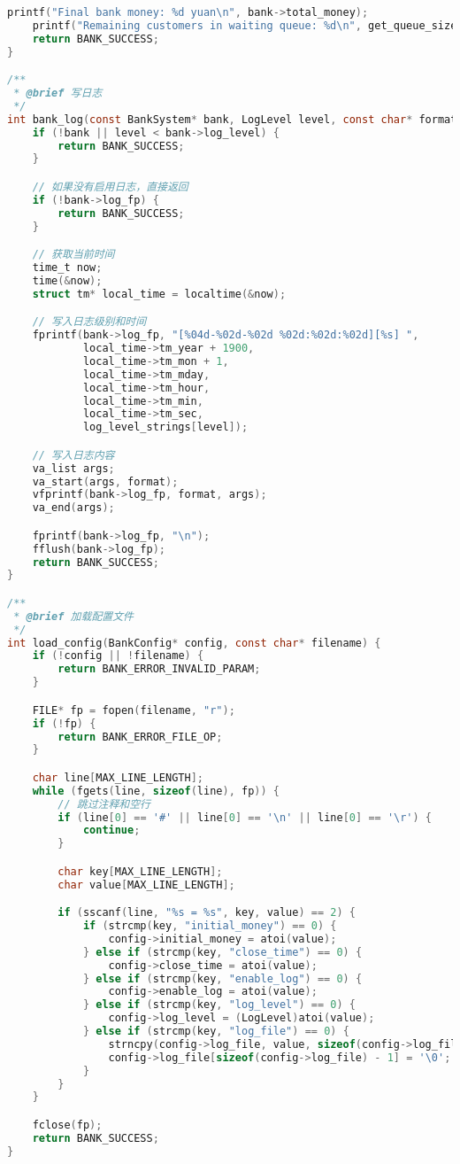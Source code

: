 \documentclass[12pt,a4paper]{article}
\begin{document}
\begin{lstlisting}[language=C,caption=bank\_simulation.c]
    printf("Final bank money: %d yuan\n", bank->total_money);
    printf("Remaining customers in waiting queue: %d\n", get_queue_size(&bank->queue2));
    return BANK_SUCCESS;
}

/**
 * @brief 写日志
 */
int bank_log(const BankSystem* bank, LogLevel level, const char* format, ...) {
    if (!bank || level < bank->log_level) {
        return BANK_SUCCESS;
    }

    // 如果没有启用日志，直接返回
    if (!bank->log_fp) {
        return BANK_SUCCESS;
    }

    // 获取当前时间
    time_t now;
    time(&now);
    struct tm* local_time = localtime(&now);

    // 写入日志级别和时间
    fprintf(bank->log_fp, "[%04d-%02d-%02d %02d:%02d:%02d][%s] ", 
            local_time->tm_year + 1900,
            local_time->tm_mon + 1,
            local_time->tm_mday,
            local_time->tm_hour,
            local_time->tm_min,
            local_time->tm_sec,
            log_level_strings[level]);

    // 写入日志内容
    va_list args;
    va_start(args, format);
    vfprintf(bank->log_fp, format, args);
    va_end(args);

    fprintf(bank->log_fp, "\n");
    fflush(bank->log_fp);
    return BANK_SUCCESS;
}

/**
 * @brief 加载配置文件
 */
int load_config(BankConfig* config, const char* filename) {
    if (!config || !filename) {
        return BANK_ERROR_INVALID_PARAM;
    }

    FILE* fp = fopen(filename, "r");
    if (!fp) {
        return BANK_ERROR_FILE_OP;
    }

    char line[MAX_LINE_LENGTH];
    while (fgets(line, sizeof(line), fp)) {
        // 跳过注释和空行
        if (line[0] == '#' || line[0] == '\n' || line[0] == '\r') {
            continue;
        }

        char key[MAX_LINE_LENGTH];
        char value[MAX_LINE_LENGTH];

        if (sscanf(line, "%s = %s", key, value) == 2) {
            if (strcmp(key, "initial_money") == 0) {
                config->initial_money = atoi(value);
            } else if (strcmp(key, "close_time") == 0) {
                config->close_time = atoi(value);
            } else if (strcmp(key, "enable_log") == 0) {
                config->enable_log = atoi(value);
            } else if (strcmp(key, "log_level") == 0) {
                config->log_level = (LogLevel)atoi(value);
            } else if (strcmp(key, "log_file") == 0) {
                strncpy(config->log_file, value, sizeof(config->log_file) - 1);
                config->log_file[sizeof(config->log_file) - 1] = '\0';
            }
        }
    }

    fclose(fp);
    return BANK_SUCCESS;
}
\end{lstlisting}
\end{document}
